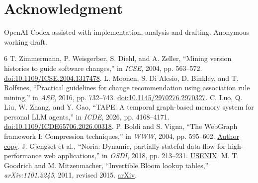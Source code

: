 \documentclass[conference]{IEEEtran}
\begin{document}
\section*{Acknowledgment}
OpenAI Codex assisted with implementation, analysis and drafting. Anonymous working draft.

\begin{thebibliography}{6}
 T. Zimmermann, P. Weisgerber, S. Diehl, and A. Zeller, “Mining version histories to guide software changes,” in \emph{ICSE}, 2004, pp. 563--572. \href{https://doi.org/10.1109/ICSE.2004.1317478}{doi:10.1109/ICSE.2004.1317478}.
 L. Moonen, S. Di Alesio, D. Binkley, and T. Rolfsnes, “Practical guidelines for change recommendation using association rule mining,” in \emph{ASE}, 2016, pp. 732--743. \href{https://doi.org/10.1145/2970276.2970327}{doi:10.1145/2970276.2970327}.
 C. Luo, Q. Liu, W. Zhang, and Y. Gao, “TAPE: A temporal graph-based memory system for personal LLM agents,” in \emph{ICDE}, 2026, pp. 4168--4171. \href{https://doi.org/10.1109/ICDE65706.2026.00318}{doi:10.1109/ICDE65706.2026.00318}.
 P. Boldi and S. Vigna, “The WebGraph framework I: Compression techniques,” in \emph{WWW}, 2004, pp. 595--602. \href{https://vigna.di.unimi.it/ftp/papers/WebGraphI.pdf}{Author copy}.
 J. Gjengset et al., “Noria: Dynamic, partially-stateful data-flow for high-performance web applications,” in \emph{OSDI}, 2018, pp. 213--231. \href{https://www.usenix.org/conference/osdi18/presentation/gjengset}{USENIX}.
 M. T. Goodrich and M. Mitzenmacher, “Invertible Bloom lookup tables,” \emph{arXiv:1101.2245}, 2011, revised 2015. \href{https://arxiv.org/abs/1101.2245}{arXiv}.
\end{thebibliography}
\end{document}
